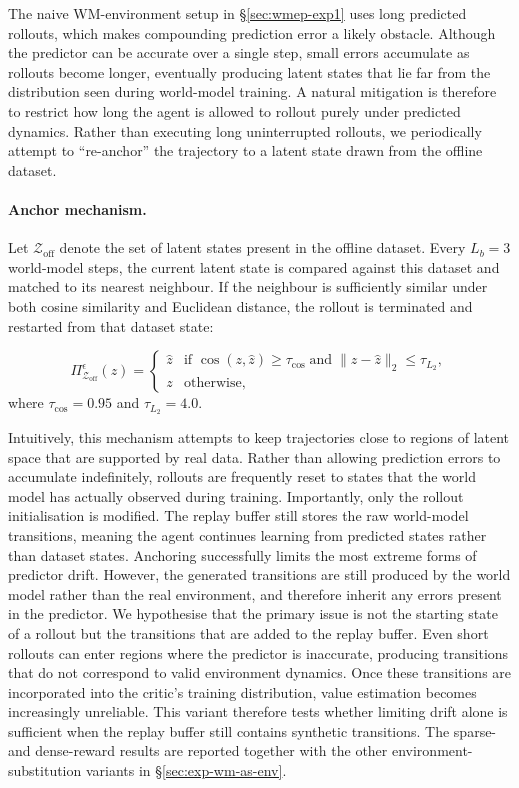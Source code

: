 The naive WM-environment setup in \S\ref{sec:wmep-exp1} uses long
predicted rollouts, which makes compounding prediction error a likely
obstacle. Although the predictor can be accurate over a single step,
small errors accumulate as rollouts become longer, eventually producing
latent states that lie far from the distribution seen during
world-model training.
A natural mitigation is therefore to restrict how long the agent is
allowed to rollout purely under predicted dynamics. Rather than
executing long uninterrupted rollouts, we periodically attempt to
``re-anchor'' the trajectory to a latent state drawn from the offline
dataset.

\paragraph{Anchor mechanism.}

Let $\mathcal Z_{\mathrm{off}}$ denote the set of latent states present
in the offline dataset. Every $L_b=3$ world-model steps, the current
latent state is compared against this dataset and matched to its
nearest neighbour. If the neighbour is sufficiently similar under both
cosine similarity and Euclidean distance, the rollout is terminated and
restarted from that dataset state:

\begin{equation}
\Pi^{\epsilon}_{\mathcal Z_{\mathrm{off}}}(z)=
\begin{cases}
\hat z
&
\text{if }
\cos(z,\hat z)\ge \tau_{\cos}
\;\text{and}\;
\|z-\hat z\|_2 \le \tau_{L_2},
\\[4pt]
z
&
\text{otherwise},
\end{cases}
\label{eq:wmep-anchor-proj}
\end{equation}
where $\tau_{\cos}=0.95$ and $\tau_{L_2}=4.0$.

Intuitively, this mechanism attempts to keep trajectories close to
regions of latent space that are supported by real data. Rather than
allowing prediction errors to accumulate indefinitely, rollouts are
frequently reset to states that the world model has actually observed
during training.
Importantly, only the rollout initialisation is modified. The replay
buffer still stores the raw world-model transitions, meaning the agent
continues learning from predicted states rather than dataset states.
Anchoring successfully limits the most extreme forms of predictor
drift. However, the generated transitions are still produced by the
world model rather than the real environment, and therefore inherit any
errors present in the predictor.
We hypothesise that the primary issue is not the starting state of a
rollout but the transitions that are added to the replay buffer. Even
short rollouts can enter regions where the predictor is inaccurate,
producing transitions that do not correspond to valid environment
dynamics. Once these transitions are incorporated into the critic's
training distribution, value estimation becomes increasingly
unreliable.
This variant therefore tests whether limiting drift alone is sufficient when the
replay buffer still contains synthetic transitions. The sparse- and dense-reward
results are reported together with the other environment-substitution variants in
\S\ref{sec:exp-wm-as-env}.

